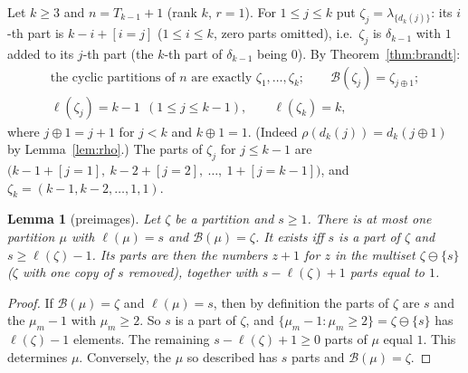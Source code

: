 \documentclass[11pt]{article}
\newtheorem{lemma}[theorem]{Lemma}
\theoremstyle{definition}
\newcommand{\B}{\mathcal{B}}
\renewcommand{\le}{\leqslant}
\renewcommand{\ge}{\geqslant}
\begin{document}
Let $k\ge3$ and $n=T_{k-1}+1$ (rank $k$, $r=1$).  For $1\le j\le k$ put $\zeta_j=\lambda_{\{d_k(j)\}}$: its $i$-th part is
$k-i+[i=j]$ ($1\le i\le k$, zero parts omitted), i.e.\ $\zeta_j$ is $\delta_{k-1}$ with $1$ added to its
$j$-th part (the $k$-th part of $\delta_{k-1}$ being $0$).  By Theorem~\ref{thm:brandt}:
\begin{equation}\label{eq:zeta}
\begin{gathered}
\text{the cyclic partitions of $n$ are exactly $\zeta_1,\dots,\zeta_k$};\qquad \B(\zeta_j)=\zeta_{j\oplus1};\\
\ell(\zeta_j)=k-1\ \ (1\le j\le k-1),\qquad \ell(\zeta_k)=k,
\end{gathered}
\end{equation}
where $j\oplus1=j+1$ for $j<k$ and $k\oplus1=1$.  (Indeed $\rho(d_k(j))=d_k(j\oplus1)$ by Lemma~\ref{lem:rho}.)
The parts of $\zeta_j$ for $j\le k-1$ are
$\bigl(k-1+[j=1],\ k-2+[j=2],\ \dots,\ 1+[j=k-1]\bigr)$, and $\zeta_k=(k-1,k-2,\dots,1,1)$.

\begin{lemma}[preimages]\label{lem:preim}
Let $\zeta$ be a partition and $s\ge1$.  There is at most one partition $\mu$ with $\ell(\mu)=s$ and
$\B(\mu)=\zeta$.  It exists iff $s$ is a part of $\zeta$ and $s\ge\ell(\zeta)-1$.  Its parts are then the numbers
$z+1$ for $z$ in the multiset $\zeta\ominus\{s\}$ ($\zeta$ with one copy of $s$ removed), together with
$s-\ell(\zeta)+1$ parts equal to $1$.
\end{lemma}
\begin{proof}
If $\B(\mu)=\zeta$ and $\ell(\mu)=s$, then by definition the parts of $\zeta$ are $s$ and the $\mu_m-1$ with
$\mu_m\ge2$.  So $s$ is a part of $\zeta$, and $\{\mu_m-1:\mu_m\ge2\}=\zeta\ominus\{s\}$ has $\ell(\zeta)-1$
elements.  The remaining $s-\ell(\zeta)+1\ge0$ parts of $\mu$ equal $1$.  This determines $\mu$.  Conversely,
the $\mu$ so described has $s$ parts and $\B(\mu)=\zeta$.
\end{proof}
\end{document}
